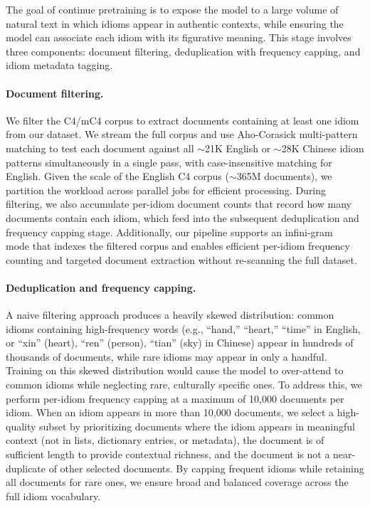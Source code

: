 \documentclass[11pt,a4paper]{article}
\begin{document}
The goal of continue pretraining is to expose the model to a large volume of natural text in which idioms appear in authentic contexts, while ensuring the model can associate each idiom with its figurative meaning. This stage involves three components: document filtering, deduplication with frequency capping, and idiom metadata tagging.

\paragraph{Document filtering.} We filter the C4/mC4 corpus to extract documents containing at least one idiom from our dataset. We stream the full corpus and use Aho-Corasick multi-pattern matching to test each document against all $\sim$21K English or $\sim$28K Chinese idiom patterns simultaneously in a single pass, with case-insensitive matching for English. Given the scale of the English C4 corpus ($\sim$365M documents), we partition the workload across parallel jobs for efficient processing. During filtering, we also accumulate per-idiom document counts that record how many documents contain each idiom, which feed into the subsequent deduplication and frequency capping stage. Additionally, our pipeline supports an infini-gram~\citep{liu2024infinigram} mode that indexes the filtered corpus and enables efficient per-idiom frequency counting and targeted document extraction without re-scanning the full dataset.

\paragraph{Deduplication and frequency capping.} A naive filtering approach produces a heavily skewed distribution: common idioms containing high-frequency words (e.g., ``hand,'' ``heart,'' ``time'' in English, or ``xin'' (heart), ``ren'' (person), ``tian'' (sky) in Chinese) appear in hundreds of thousands of documents, while rare idioms may appear in only a handful. Training on this skewed distribution would cause the model to over-attend to common idioms while neglecting rare, culturally specific ones. To address this, we perform per-idiom frequency capping at a maximum of 10,000 documents per idiom. When an idiom appears in more than 10,000 documents, we select a high-quality subset by prioritizing documents where the idiom appears in meaningful context (not in lists, dictionary entries, or metadata), the document is of sufficient length to provide contextual richness, and the document is not a near-duplicate of other selected documents. By capping frequent idioms while retaining all documents for rare ones, we ensure broad and balanced coverage across the full idiom vocabulary.
\end{document}

